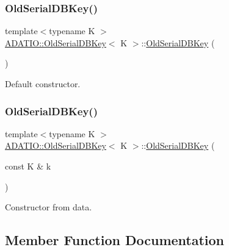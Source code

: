 \subsubsection{\texorpdfstring{OldSerialDBKey()}{OldSerialDBKey()}\hspace{0.1cm}{\footnotesize\ttfamily [5/6]}}
{\footnotesize\ttfamily template$<$typename K $>$ \\
\mbox{\hyperlink{classADATIO_1_1OldSerialDBKey}{A\+D\+A\+T\+I\+O\+::\+Old\+Serial\+D\+B\+Key}}$<$ K $>$\+::\mbox{\hyperlink{classADATIO_1_1OldSerialDBKey}{Old\+Serial\+D\+B\+Key}} (\begin{DoxyParamCaption}{ }\end{DoxyParamCaption})\hspace{0.3cm}{\ttfamily [inline]}}



Default constructor. 

\mbox{\label{classADATIO_1_1OldSerialDBKey_a3b075f5aaa5e0d5e29f5a5dcfe51d575}} 
\subsubsection{\texorpdfstring{OldSerialDBKey()}{OldSerialDBKey()}\hspace{0.1cm}{\footnotesize\ttfamily [6/6]}}
{\footnotesize\ttfamily template$<$typename K $>$ \\
\mbox{\hyperlink{classADATIO_1_1OldSerialDBKey}{A\+D\+A\+T\+I\+O\+::\+Old\+Serial\+D\+B\+Key}}$<$ K $>$\+::\mbox{\hyperlink{classADATIO_1_1OldSerialDBKey}{Old\+Serial\+D\+B\+Key}} (\begin{DoxyParamCaption}\item[{const K \&}]{k }\end{DoxyParamCaption})\hspace{0.3cm}{\ttfamily [inline]}}



Constructor from data. 



\subsection{Member Function Documentation}
\mbox{\label{classADATIO_1_1OldSerialDBKey_a9f6e624dc2c8940397632286dbab1f61}} 
